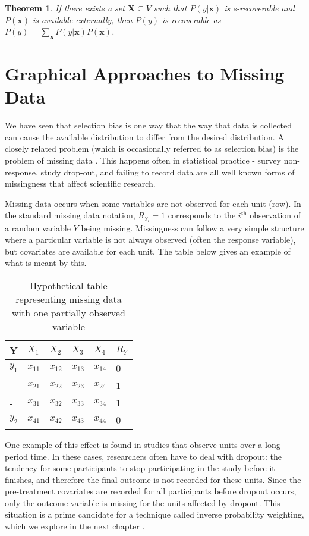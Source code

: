 \documentclass[12pt,twoside]{reedthesis}
\newtheorem{theorem}{Theorem}
\theoremstyle{definition}
\begin{document}
\begin{theorem}
If there exists a set $\mathbf{X} \subseteq V$ such that $P(y|\mathbf{x})$ is s-recoverable and $P(\mathbf{x})$ is available externally, then $P(y)$ is recoverable as $P(y) = \sum_{\mathbf{x}} P(y|\mathbf{x})P(\mathbf{x})$.
\end{theorem}

\chapter{Graphical Approaches to Missing Data}

We have seen that selection bias is one way that the way that data is collected can cause the available distribution to differ from the desired distribution. A closely related problem (which is occasionally referred to as selection bias) is the problem of missing data \citep{Heckman_1979}. This happens often in statistical practice - survey non-response, study drop-out, and failing to record data are all well known forms of missingness that affect scientific research. 

Missing data occurs when some variables are not observed for each unit (row). In the standard missing data notation, $R_{Y_i}=1$ corresponds to the $i^{\text{th}}$ observation of a random variable $Y$ being missing. Missingness can follow a very simple structure where a particular variable is not always observed (often the response variable), but covariates are available for each unit. The table below gives an example of what is meant by this. 


\begin{table}[]
\centering
\begin{tabular}{|l|l|l|l|l|l|}
Y     & $X_1$  & $X_2$  & $X_3$  & $X_4$  & $R_Y$ \\ \hline
$y_1$ & $x_{11}$ & $x_{12}$ & $x_{13}$ & $x_{14}$ & 0 \\
   -   & $x_{21}$ & $x_{22}$ & $x_{23}$ & $x_{24}$ & 1 \\
   -   & $x_{31}$ & $x_{32}$ & $x_{33}$ & $x_{34}$ & 1 \\
$y_2$ & $x_{41}$ & $x_{42}$ & $x_{43}$ & $x_{44}$ & 0
\end{tabular}
\caption{Hypothetical table representing missing data with one partially observed variable} 
\end{table}

One example of this effect is found in studies that observe units over a long period time. In these cases, researchers often have to deal with dropout: the tendency for some participants to stop participating in the study before it finishes, and therefore the final outcome is not recorded for these units. Since the pre-treatment covariates are recorded for all participants before dropout occurs, only the outcome variable is missing for the units affected by dropout. This situation is a prime candidate for a technique called inverse probability weighting, which we explore in the next chapter \citep{Hernan_2004}.
\end{document}

